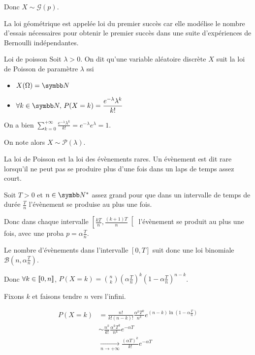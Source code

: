 Donc $X \sim \mathcal G(p)$.

La loi géométrique est appelée loi du premier succès car elle modélise le nombre d'essais nécessaires pour obtenir le premier succès
dans une suite d'expériences de Bernoulli indépendantes.

\begin{definition}{Loi de poisson }{}
    Soit $\lambda > 0$. On dit qu'une variable aléatoire discrète $X$ suit la loi de 
    Poisson de paramètre $\lambda$ ssi 
    \begin{itemize}
        \item $X(\Omega) = \N$
        \item $\displaystyle \forall k \in \N, \, P(X = k) = \frac{e^{- \lambda} \lambda^k}{k!}$
    \end{itemize}

    On a bien $\displaystyle \sum_{k = 0}^{+ \infty} \frac{e^{- \lambda} \lambda^k}{k!} = e^{- \lambda} e^{\lambda} = 1$.

    On note alors $X \sim \mathcal P(\lambda)$.
\end{definition}


La loi de Poisson est la loi des évènements rares. Un évènement est dit rare lorsqu'il ne peut pas se produire 
plus d'une fois dans un laps de temps assez court. 

Soit $T > 0$ et $n \in \N^*$ assez grand pour que dans un intervalle de temps de durée 
$\frac T n$ l'évènement se produise au plus une fois. 

Donc dans chaque intervalle $\left[ \frac{kT} n, \frac{(k + 1)T}{n} \right[$ l'évènement se produit au plus
une fois, avec une proba $p = \alpha \frac T n$. 

Le nombre d'évènements dans l'intervalle $[0, T]$ suit donc une loi 
binomiale $\mathcal B\left( n, \alpha \frac T n \right)$.

Donc $\displaystyle \forall k \in [\![0, n]\!]$, $P(X = k) = \binom n k \left( \alpha \frac T n \right)^k \left( 1 - \alpha \frac T n \right)^{n - k}$.

Fixons $k$ et faisons tendre $n$ vers l'infini.

\begin{align}
    P(X = k ) & = \frac{n!}{k! (n - k)!} \frac{\alpha^k T^k}{n^k} e^{(n - k) \ln \left( 1 - \alpha \frac T n \right)} \\
    & \sim \frac{n^k}{k!} \frac{\alpha^k T^k}{n^k} e^{- \alpha T} \\
    & \xrightarrow[n \to + \infty]{} \frac{(\alpha T)^k}{k!} e^{- \alpha T}
\end{align}

